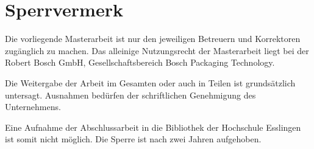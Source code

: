 \chapter*{Sperrvermerk}
\thispagestyle{empty}
Die vorliegende Masterarbeit ist nur den jeweiligen Betreuern und Korrektoren zugänglich zu machen. Das alleinige
Nutzungsrecht der Masterarbeit liegt bei der Robert Bosch GmbH, Gesellschaftsbereich Bosch Packaging
Technology.

Die Weitergabe der Arbeit im Gesamten oder auch in Teilen ist grundsätzlich untersagt. Ausnahmen bedürfen der
schriftlichen Genehmigung des Unternehmens.

Eine Aufnahme der Abschlussarbeit in die Bibliothek der Hochschule Esslingen ist somit nicht möglich. Die Sperre ist
nach zwei Jahren aufgehoben.